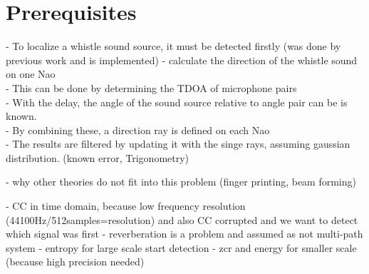 \chapter{Prerequisites}

- To localize a whistle sound source, it must be detected firstly (was done by previous work
and is implemented)
- calculate the direction of the whistle sound on one Nao\\
- This can be done by determining the \ac{TDOA} of microphone pairs\\
- With the delay, the angle of the sound source relative to angle pair
can be is known.\\
- By combining these, a direction ray is defined on each Nao\\
- The results are filtered by updating it with the singe rays, assuming
gaussian distribution. (known error, Trigonometry)

- why other theories do not fit into this problem
(finger printing, beam forming)

- CC in time domain, because low frequency resolution (44100Hz/512samples=resolution)
and also \ac{CC} corrupted and we want to detect which signal was first
- reverberation is a problem and assumed as not multi-path system
- entropy for large scale start detection
- zcr and energy for smaller scale (because high precision needed)







%
%

%
